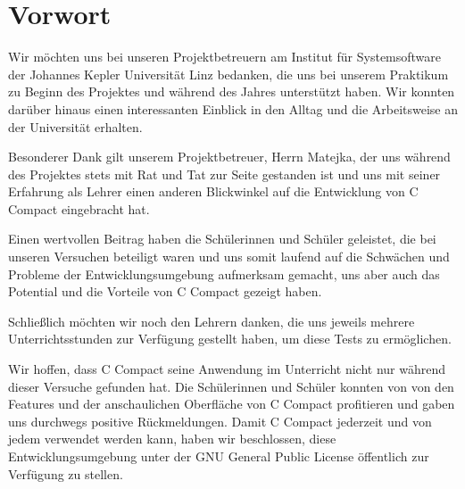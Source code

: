 

\chapter*{Vorwort}



Wir möchten uns bei unseren Projektbetreuern am Institut für Systemsoftware der Johannes Kepler Universität Linz bedanken, die uns bei unserem Praktikum zu Beginn des Projektes und während des Jahres unterstützt haben. Wir konnten darüber hinaus einen interessanten Einblick in den Alltag und die Arbeitsweise an der Universität erhalten.

Besonderer Dank gilt unserem Projektbetreuer, Herrn Matejka, der uns während des Projektes stets mit Rat und Tat zur Seite gestanden ist und uns mit seiner Erfahrung als Lehrer einen anderen Blickwinkel auf die Entwicklung von C Compact eingebracht hat.

Einen wertvollen Beitrag haben die Schülerinnen und Schüler geleistet, die bei unseren Versuchen beteiligt waren und uns somit laufend auf die Schwächen und Probleme der Entwicklungsumgebung aufmerksam gemacht, uns aber auch das Potential und die Vorteile von C Compact gezeigt haben.

Schließlich möchten wir noch den Lehrern danken, die uns jeweils mehrere Unterrichtsstunden zur Verfügung gestellt haben, um diese Tests zu ermöglichen.

Wir hoffen, dass C Compact seine Anwendung im Unterricht nicht nur während dieser Versuche gefunden hat. Die Schülerinnen und Schüler konnten von von den Features und der anschaulichen Oberfläche von C Compact profitieren und gaben uns durchwegs positive Rückmeldungen. Damit C Compact jederzeit und von jedem verwendet werden kann, haben wir beschlossen, diese Entwicklungsumgebung unter der GNU General Public License öffentlich zur Verfügung zu stellen.